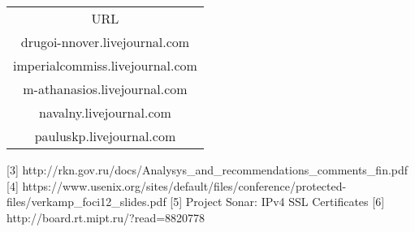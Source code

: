 \begin{table}[h!]
    \label{lj-blocked-blogs}
    \begin{tabular}{| c |}
        URL\\
        drugoi-nnover.livejournal.com \\
        imperialcommiss.livejournal.com \\
        m-athanasios.livejournal.com \\
        navalny.livejournal.com \\
        pauluskp.livejournal.com \\
    \end{tabular}
\end{table}


[3] http://rkn.gov.ru/docs/Analysys_and_recommendations_comments_fin.pdf
[4] https://www.usenix.org/sites/default/files/conference/protected-files/verkamp_foci12_slides.pdf
[5] Project Sonar: IPv4 SSL Certificates
[6] http://board.rt.mipt.ru/?read=8820778



